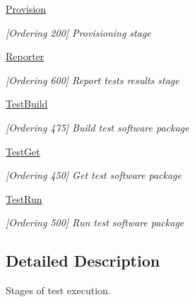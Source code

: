 \begin{DoxyCompactItemize}
\hyperlink{group__Provision}{Provision}
\begin{DoxyCompactList}\small\item\em \mbox{[}Ordering 200\mbox{]} Provisioning stage \end{DoxyCompactList}\item 
\hyperlink{group__Reporter}{Reporter}
\begin{DoxyCompactList}\small\item\em \mbox{[}Ordering 600\mbox{]} Report tests results stage \end{DoxyCompactList}\item 
\hyperlink{group__TestBuild}{Test\-Build}
\begin{DoxyCompactList}\small\item\em \mbox{[}Ordering 475\mbox{]} Build test software package \end{DoxyCompactList}\item 
\hyperlink{group__TestGet}{Test\-Get}
\begin{DoxyCompactList}\small\item\em \mbox{[}Ordering 450\mbox{]} Get test software package \end{DoxyCompactList}\item 
\hyperlink{group__TestRun}{Test\-Run}
\begin{DoxyCompactList}\small\item\em \mbox{[}Ordering 500\mbox{]} Run test software package \end{DoxyCompactList}\end{DoxyCompactItemize}


\subsection{Detailed Description}
Stages of test execution. 